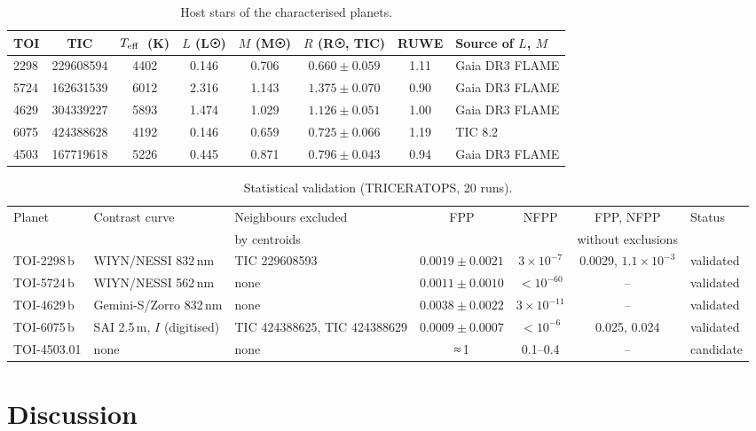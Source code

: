 \documentclass[fleqn,usenatbib]{mnras}
\newcommand{\Teff}{\ensuremath{T_{\rm eff}}}
\begin{document}
\begin{table}
\centering
\caption{Host stars of the characterised planets.}
\label{tab:stars}
\begin{tabular}{lccccccl}
\toprule
TOI & TIC & \Teff\ (K) & $L$ (L☉) & $M$ (M☉) & $R$ (R☉, TIC) & RUWE & Source of $L$, $M$ \\
\midrule
2298 & 229608594 & 4402 & 0.146 & 0.706 & $0.660 \pm 0.059$ & 1.11 & Gaia DR3 FLAME \\
5724 & 162631539 & 6012 & 2.316 & 1.143 & $1.375 \pm 0.070$ & 0.90 & Gaia DR3 FLAME \\
4629 & 304339227 & 5893 & 1.474 & 1.029 & $1.126 \pm 0.051$ & 1.00 & Gaia DR3 FLAME \\
6075 & 424388628 & 4192 & 0.146 & 0.659 & $0.725 \pm 0.066$ & 1.19 & TIC 8.2 \\
4503 & 167719618 & 5226 & 0.445 & 0.871 & $0.796 \pm 0.043$ & 0.94 & Gaia DR3 FLAME \\
\bottomrule
\end{tabular}
\end{table}

\begin{table}
\centering
\caption{Statistical validation (TRICERATOPS, 20 runs).}
\label{tab:fpp}
\small
\setlength{\tabcolsep}{4pt}
\begin{tabular}{lllcccl}
\toprule
Planet & Contrast curve & Neighbours excluded & FPP & NFPP & FPP, NFPP & Status \\
 & & by centroids & & & without exclusions & \\
\midrule
TOI-2298\,b & WIYN/NESSI 832\,nm & TIC 229608593 & $0.0019 \pm 0.0021$ & $3 \times 10^{-7}$ & 0.0029, $1.1 \times 10^{-3}$ & validated \\
TOI-5724\,b & WIYN/NESSI 562\,nm & none & $0.0011 \pm 0.0010$ & $< 10^{-60}$ & -- & validated \\
TOI-4629\,b & Gemini-S/Zorro 832\,nm & none & $0.0038 \pm 0.0022$ & $3 \times 10^{-11}$ & -- & validated \\
TOI-6075\,b & SAI 2.5\,m, $I$ (digitised) & TIC 424388625, TIC 424388629 & $0.0009 \pm 0.0007$ & $< 10^{-6}$ & 0.025, 0.024 & validated \\
TOI-4503.01 & none & none & ≈\,1 & 0.1--0.4 & -- & candidate \\
\bottomrule
\end{tabular}
\end{table}

\section{Discussion}
\label{sec:discussion}
\end{document}
